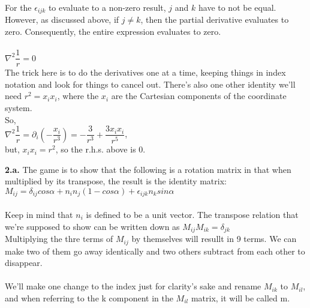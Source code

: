 \documentclass[prb,preprint]
{revtex4-1}
\newcommand{\PRLsep}{\noindent\makebox[\linewidth]{\resizebox{0.8888\linewidth}{2pt}{$\bullet$}}\bigskip}
\begin{document}
For the $\epsilon_{ijk}$ to evaluate to a non-zero result, $j$ and $k$ have to not be equal.  However, as discussed above, if $j \ne k$, then the partial derivative evaluates to zero.  Consequently, the entire expression evaluates to zero.
\\
\PRLsep
\\
$\nabla^2 \dfrac{1}{r} = 0$\\
The trick here is to do the derivatives one at a time, keeping things in index notation and look for things to cancel out.  There's also one other identity we'll need $r^2 = x_i x_i$, where the $x_i$ are the Cartesian components of the coordinate system.
\\
So,
\\
$\nabla^2 \dfrac{1}{r} = \partial_i \left(- \dfrac{x_i}{r^3}\right) = -\dfrac{3}{r^3} + \dfrac{3x_i x_i}{r^5}$,
\\
but, $x_i x_i = r^2$, so the r.h.s. above is 0.
\\
\PRLsep

\newpage

{\bf 2.a.} The game is to show that the following is a rotation matrix in that when multiplied by its transpose, the result is the identity matrix:\\
$M_{ij} = \delta_{ij}cos \alpha + n_i n_j \left(1 - cos \alpha\right) + \epsilon_{ijk}n_k sin \alpha$
\\\\
Keep in mind that $n_i$ is defined to be a unit vector.  The transpose relation that we're supposed to show can be written down as $M_{ij}M_{ik} = \delta_{jk}$\\


Multiplying the thre terms of $M_{ij}$ by themselves will resullt in 9 terms.  We can make two of them go away identically and two others subtract from each other to disappear.\\\\

We'll make one change to the index just for clarity's sake and rename $M_{ik}$ to $M_{il}$, and when referring to the k component in the $M_{il}$ matrix, it will be called m.
\end{document}
